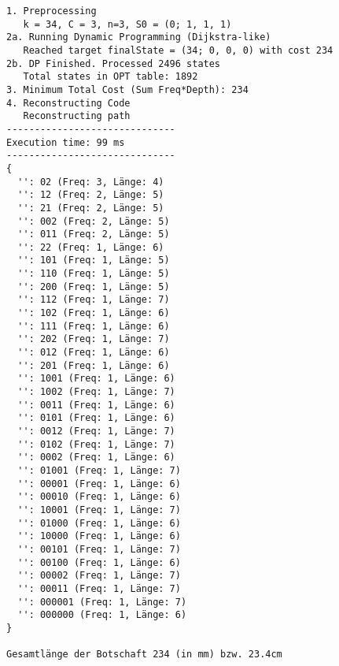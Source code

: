 \documentclass[a4paper,10pt,ngerman]{scrartcl}
\begin{document}
\begin{enumerate}
  \begin{verbatim}
1. Preprocessing
   k = 34, C = 3, n=3, S0 = (0; 1, 1, 1)
2a. Running Dynamic Programming (Dijkstra-like)
   Reached target finalState = (34; 0, 0, 0) with cost 234
2b. DP Finished. Processed 2496 states
   Total states in OPT table: 1892
3. Minimum Total Cost (Sum Freq*Depth): 234
4. Reconstructing Code
   Reconstructing path
------------------------------
Execution time: 99 ms
------------------------------
{
  '': 02 (Freq: 3, Länge: 4)
  '': 12 (Freq: 2, Länge: 5)
  '': 21 (Freq: 2, Länge: 5)
  '': 002 (Freq: 2, Länge: 5)
  '': 011 (Freq: 2, Länge: 5)
  '': 22 (Freq: 1, Länge: 6)
  '': 101 (Freq: 1, Länge: 5)
  '': 110 (Freq: 1, Länge: 5)
  '': 200 (Freq: 1, Länge: 5)
  '': 112 (Freq: 1, Länge: 7)
  '': 102 (Freq: 1, Länge: 6)
  '': 111 (Freq: 1, Länge: 6)
  '': 202 (Freq: 1, Länge: 7)
  '': 012 (Freq: 1, Länge: 6)
  '': 201 (Freq: 1, Länge: 6)
  '': 1001 (Freq: 1, Länge: 6)
  '': 1002 (Freq: 1, Länge: 7)
  '': 0011 (Freq: 1, Länge: 6)
  '': 0101 (Freq: 1, Länge: 6)
  '': 0012 (Freq: 1, Länge: 7)
  '': 0102 (Freq: 1, Länge: 7)
  '': 0002 (Freq: 1, Länge: 6)
  '': 01001 (Freq: 1, Länge: 7)
  '': 00001 (Freq: 1, Länge: 6)
  '': 00010 (Freq: 1, Länge: 6)
  '': 10001 (Freq: 1, Länge: 7)
  '': 01000 (Freq: 1, Länge: 6)
  '': 10000 (Freq: 1, Länge: 6)
  '': 00101 (Freq: 1, Länge: 7)
  '': 00100 (Freq: 1, Länge: 6)
  '': 00002 (Freq: 1, Länge: 7)
  '': 00011 (Freq: 1, Länge: 7)
  '': 000001 (Freq: 1, Länge: 7)
  '': 000000 (Freq: 1, Länge: 6)
}

Gesamtlänge der Botschaft 234 (in mm) bzw. 23.4cm


\end{verbatim}
\end{enumerate}
\end{document}
